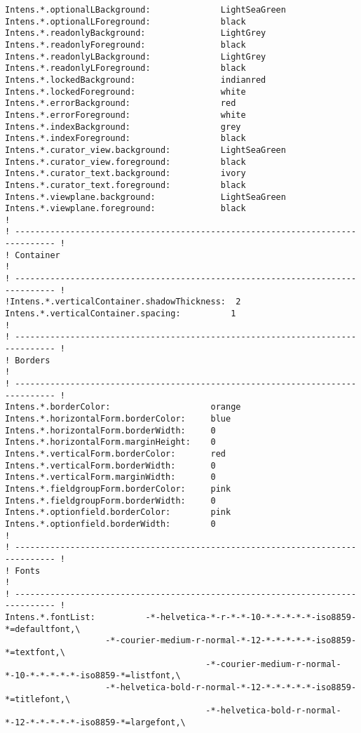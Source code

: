 {\begin{verbatim}
Intens.*.optionalLBackground:              LightSeaGreen
Intens.*.optionalLForeground:              black
Intens.*.readonlyBackground:               LightGrey
Intens.*.readonlyForeground:               black
Intens.*.readonlyLBackground:              LightGrey
Intens.*.readonlyLForeground:              black
Intens.*.lockedBackground:                 indianred
Intens.*.lockedForeground:                 white
Intens.*.errorBackground:                  red
Intens.*.errorForeground:                  white
Intens.*.indexBackground:                  grey
Intens.*.indexForeground:                  black
Intens.*.curator_view.background:          LightSeaGreen
Intens.*.curator_view.foreground:          black
Intens.*.curator_text.background:          ivory
Intens.*.curator_text.foreground:          black
Intens.*.viewplane.background:             LightSeaGreen
Intens.*.viewplane.foreground:             black
!
! ------------------------------------------------------------------------------ !
! Container                                                                      !
! ------------------------------------------------------------------------------ !
!Intens.*.verticalContainer.shadowThickness:  2
Intens.*.verticalContainer.spacing:          1
!
! ------------------------------------------------------------------------------ !
! Borders                                                                        !
! ------------------------------------------------------------------------------ !
Intens.*.borderColor:                    orange
Intens.*.horizontalForm.borderColor:     blue
Intens.*.horizontalForm.borderWidth:     0
Intens.*.horizontalForm.marginHeight:    0
Intens.*.verticalForm.borderColor:       red
Intens.*.verticalForm.borderWidth:       0
Intens.*.verticalForm.marginWidth:       0
Intens.*.fieldgroupForm.borderColor:     pink
Intens.*.fieldgroupForm.borderWidth:     0
Intens.*.optionfield.borderColor:        pink
Intens.*.optionfield.borderWidth:        0
!
! ------------------------------------------------------------------------------ !
! Fonts                                                                          !
! ------------------------------------------------------------------------------ !
Intens.*.fontList:			-*-helvetica-*-r-*-*-10-*-*-*-*-*-iso8859-*=defaultfont,\
					-*-courier-medium-r-normal-*-12-*-*-*-*-*-iso8859-*=textfont,\
                                        -*-courier-medium-r-normal-*-10-*-*-*-*-*-iso8859-*=listfont,\
					-*-helvetica-bold-r-normal-*-12-*-*-*-*-*-iso8859-*=titlefont,\
                                        -*-helvetica-bold-r-normal-*-12-*-*-*-*-*-iso8859-*=largefont,\

\end{verbatim}}
